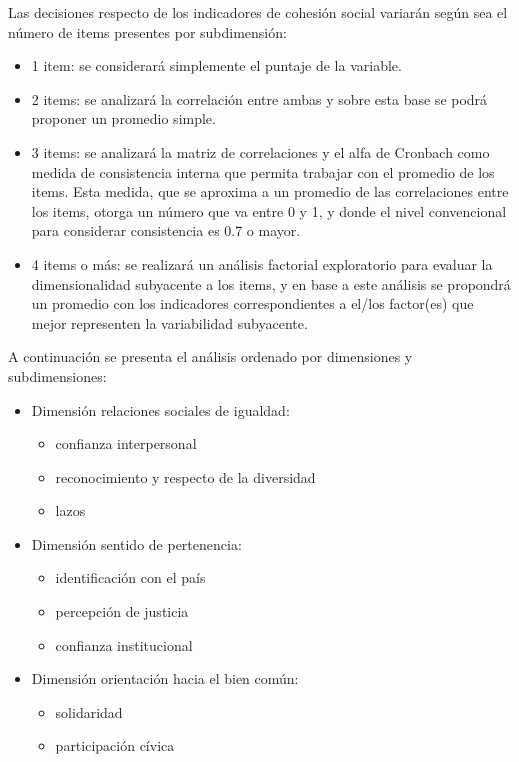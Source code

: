 \documentclass[
  12pt,
]{book}
\providecommand{\tightlist}{%
  \setlength{\itemsep}{0pt}\setlength{\parskip}{0pt}}
\begin{document}
Las decisiones respecto de los indicadores de cohesión social variarán según sea el número de items presentes por subdimensión:

\begin{itemize}
\item
  1 item: se considerará simplemente el puntaje de la variable.
\item
  2 items: se analizará la correlación entre ambas y sobre esta base se podrá proponer un promedio simple.
\item
  3 items: se analizará la matriz de correlaciones y el alfa de Cronbach como medida de consistencia interna que permita trabajar con el promedio de los items. Esta medida, que se aproxima a un promedio de las correlaciones entre los items, otorga un número que va entre 0 y 1, y donde el nivel convencional para considerar consistencia es 0.7 o mayor.
\item
  4 items o más: se realizará un análisis factorial exploratorio para evaluar la dimensionalidad subyacente a los items, y en base a este análisis se propondrá un promedio con los indicadores correspondientes a el/los factor(es) que mejor representen la variabilidad subyacente.
\end{itemize}

A continuación se presenta el análisis ordenado por dimensiones y subdimensiones:

\begin{itemize}
\tightlist
\item
  Dimensión relaciones sociales de igualdad:

  \begin{itemize}
  \tightlist
  \item
    confianza interpersonal
  \item
    reconocimiento y respecto de la diversidad
  \item
    lazos
  \end{itemize}
\item
  Dimensión sentido de pertenencia:

  \begin{itemize}
  \tightlist
  \item
    identificación con el país
  \item
    percepción de justicia
  \item
    confianza institucional
  \end{itemize}
\item
  Dimensión orientación hacia el bien común:

  \begin{itemize}
  \tightlist
  \item
    solidaridad
  \item
    participación cívica
  \end{itemize}
\end{itemize}
\end{document}
